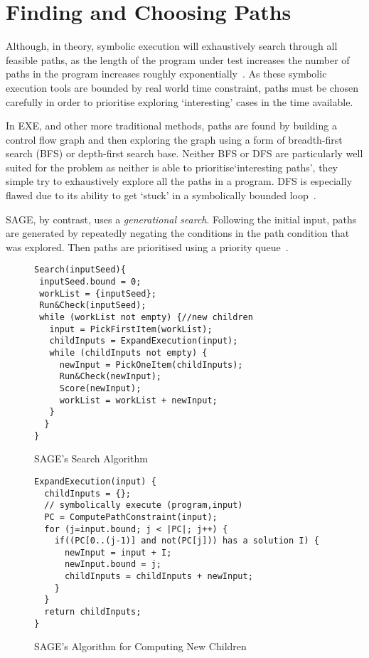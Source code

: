 \documentclass[]{final_report}
\begin{document}
\section{Finding and Choosing Paths}

Although, in theory, symbolic execution will exhaustively search through all feasible paths, as the length of the program under test increases the number of paths in the program increases roughly exponentially~\cite{cadar2013symbolic}. As these symbolic execution tools are bounded by real world time constraint, paths must be chosen carefully in order to prioritise exploring `interesting' cases in the time available.

In EXE, and other more traditional methods, paths are found by building a control flow graph and then exploring the graph using a form of breadth-first search (BFS) or depth-first search base. Neither BFS or DFS are particularly well suited for the problem as neither is able to prioritise`interesting paths', they simple try to exhaustively explore all the paths in a program. DFS is especially flawed due to its ability to get `stuck' in a symbolically bounded loop~\cite{cadar2008exe}. 

SAGE, by contrast, uses a \textit{generational search}. Following the initial input, paths are generated by repeatedly negating the conditions in the path condition that was explored. Then paths are prioritised using a priority queue~\cite{godefroid2005dart}.

\begin{figure}[h]
\begin{lstlisting}
Search(inputSeed){
 inputSeed.bound = 0;
 workList = {inputSeed};
 Run&Check(inputSeed);
 while (workList not empty) {//new children
   input = PickFirstItem(workList);
   childInputs = ExpandExecution(input);
   while (childInputs not empty) {
     newInput = PickOneItem(childInputs);
     Run&Check(newInput);
     Score(newInput);
     workList = workList + newInput;
   }
  }
}
\end{lstlisting}
\caption{\label{fig:sage-search} SAGE's Search Algorithm}
\end{figure}

\begin{figure}[h]
\begin{lstlisting}
ExpandExecution(input) {
  childInputs = {};
  // symbolically execute (program,input)
  PC = ComputePathConstraint(input);
  for (j=input.bound; j < |PC|; j++) {
    if((PC[0..(j-1)] and not(PC[j])) has a solution I) {
      newInput = input + I;
      newInput.bound = j;
      childInputs = childInputs + newInput;
    }
  }
  return childInputs;
}

\end{lstlisting}
\caption{\label{fig:sage-compute-new-children} SAGE's Algorithm for Computing New Children}
\end{figure}
\end{document}
